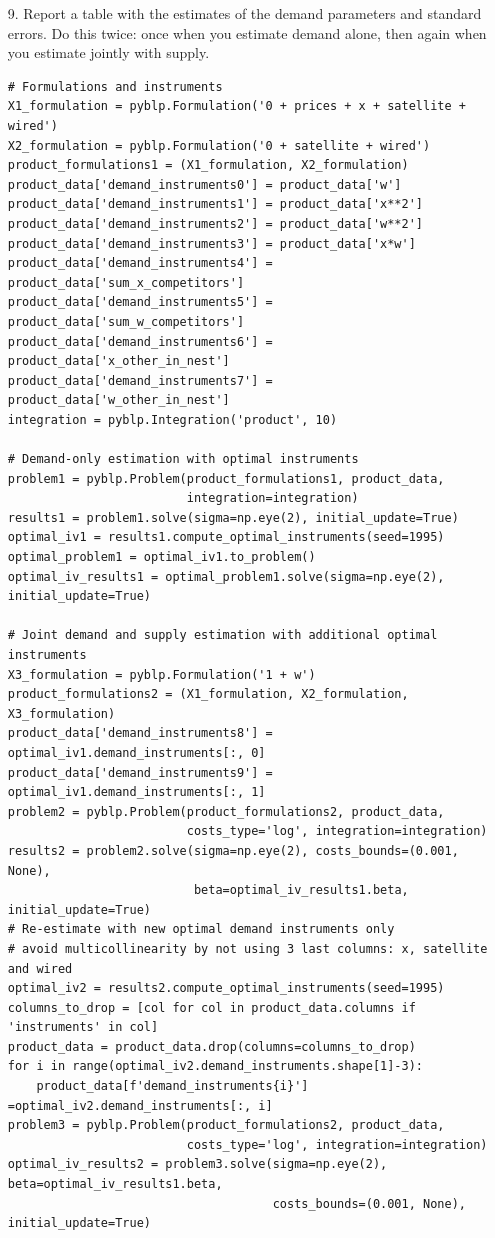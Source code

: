 \documentclass[english,11pt]{article}
\begin{document}
\begin{enumerate}
\item[9.] Report a table with the estimates of the demand
parameters and standard errors. Do this twice: once when you estimate demand
alone, then again when you estimate jointly with supply.

\begin{verbatim}
# Formulations and instruments
X1_formulation = pyblp.Formulation('0 + prices + x + satellite + wired')
X2_formulation = pyblp.Formulation('0 + satellite + wired')
product_formulations1 = (X1_formulation, X2_formulation)
product_data['demand_instruments0'] = product_data['w']
product_data['demand_instruments1'] = product_data['x**2']
product_data['demand_instruments2'] = product_data['w**2']
product_data['demand_instruments3'] = product_data['x*w']
product_data['demand_instruments4'] = product_data['sum_x_competitors']
product_data['demand_instruments5'] = product_data['sum_w_competitors']
product_data['demand_instruments6'] = product_data['x_other_in_nest']
product_data['demand_instruments7'] = product_data['w_other_in_nest']
integration = pyblp.Integration('product', 10)

# Demand-only estimation with optimal instruments
problem1 = pyblp.Problem(product_formulations1, product_data, 
                         integration=integration)
results1 = problem1.solve(sigma=np.eye(2), initial_update=True)
optimal_iv1 = results1.compute_optimal_instruments(seed=1995)
optimal_problem1 = optimal_iv1.to_problem()
optimal_iv_results1 = optimal_problem1.solve(sigma=np.eye(2), initial_update=True)

# Joint demand and supply estimation with additional optimal instruments 
X3_formulation = pyblp.Formulation('1 + w')
product_formulations2 = (X1_formulation, X2_formulation, X3_formulation)
product_data['demand_instruments8'] = optimal_iv1.demand_instruments[:, 0]
product_data['demand_instruments9'] = optimal_iv1.demand_instruments[:, 1]
problem2 = pyblp.Problem(product_formulations2, product_data, 
                         costs_type='log', integration=integration)
results2 = problem2.solve(sigma=np.eye(2), costs_bounds=(0.001, None), 
                          beta=optimal_iv_results1.beta, initial_update=True)
# Re-estimate with new optimal demand instruments only
# avoid multicollinearity by not using 3 last columns: x, satellite and wired
optimal_iv2 = results2.compute_optimal_instruments(seed=1995)
columns_to_drop = [col for col in product_data.columns if 'instruments' in col]
product_data = product_data.drop(columns=columns_to_drop)
for i in range(optimal_iv2.demand_instruments.shape[1]-3): 
    product_data[f'demand_instruments{i}'] =optimal_iv2.demand_instruments[:, i]
problem3 = pyblp.Problem(product_formulations2, product_data, 
                         costs_type='log', integration=integration)
optimal_iv_results2 = problem3.solve(sigma=np.eye(2), beta=optimal_iv_results1.beta,
                                     costs_bounds=(0.001, None), initial_update=True)
\end{verbatim}


\end{enumerate}
\end{document}
